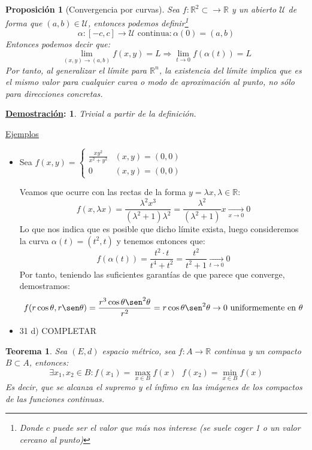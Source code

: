 \documentclass[10pt,a4paper,openright]{book}
\theoremstyle{break}
\newtheorem*{theo}{Teorema}
\newtheorem*{prop}{Proposición}
\newtheorem*{demo}{\underline{Demostración}:}
\begin{document}
\begin{prop}[Convergencia por curvas]
Sea $f: \mathbb{R}^2 \subset \to \mathbb{R}$ y un abierto $\mathcal{U}$ de forma que $(a,b) \in \mathcal{U}$, entonces podemos definir\footnote{Donde $c$ puede ser el valor que más nos interese (se suele coger 1 o un valor cercano al punto)}
$$\alpha: [-c,c] \to \mathcal{U} \mbox{ continua} : \alpha(0) = (a,b)$$ Entonces podemos decir que:
$$\lim_{(x,y) \to (a,b)} f(x,y) = L\Rightarrow\lim_{t \to 0} f(\alpha(t)) = L$$
Por tanto, al generalizar el límite para $\mathbb{R}^n$, la existencia del límite implica que es el mismo valor para cualquier curva o modo de aproximación al punto, no sólo para direcciones concretas.
\end{prop}
\begin{demo}
Trivial a partir de la definición.
\end{demo}

\underline{Ejemplos}
\begin{itemize}
\item Sea $f(x,y) = \begin{cases} \frac{xy^2}{x^2 + y^2} & (x,y) = (0,0) \\ 0 & (x,y) = (0,0) \end{cases}$

Veamos que ocurre con las rectas de la forma $y = \lambda x, \lambda \in \mathbb{R}$:
$$f(x,\lambda x) = \frac{\lambda^2x^3}{(\lambda^2 + 1) \lambda^2} = \frac{\lambda^2}{(\lambda^2 + 1)} x \xrightarrow[x \to 0]{} 0$$
Lo que nos indica que es posible que dicho límite exista, luego consideremos la curva $\alpha(t)= (t^2, t)$ y tenemos entonces que:
$$f(\alpha(t)) = \frac{t^2 \cdot t}{t^4 + t^2} = \frac{t^2}{t^2 + 1} \xrightarrow[t \to 0]{} 0$$
Por tanto, teniendo las suficientes garantías de que parece que converge, demostramos:
$$f(r \cos \theta, r \sen \theta) = \frac{r^3 \cos\theta \sen^2 \theta}{r^2} = r \cos \theta \sen^2 \theta \rightarrow 0 \mbox{ uniformemente en } \theta $$

\item 31 d) COMPLETAR
\end{itemize}

\begin{theo}
Sea $(E,d)$ espacio métrico, sea $f: A \to \mathbb{R}$ continua y un compacto $B \subset A$, entonces:
$$\exists x_1, x_2 \in B : f(x_1) = \max_{x \in B} f(x) \ \ \ f(x_2) = \min_{x \in B} f(x)$$
Es decir, que se alcanza el supremo y el ínfimo en las imágenes de los compactos de las funciones continuas.
\end{theo}
\end{document}
